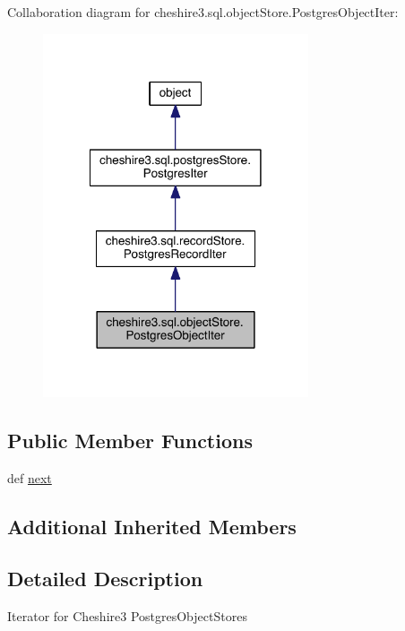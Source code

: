 Collaboration diagram for cheshire3.\-sql.\-object\-Store.\-Postgres\-Object\-Iter\-:
\nopagebreak
\begin{figure}[H]
\begin{center}
\leavevmode
\includegraphics[width=222pt]{classcheshire3_1_1sql_1_1object_store_1_1_postgres_object_iter__coll__graph}
\end{center}
\end{figure}
\subsection*{Public Member Functions}
\begin{DoxyCompactItemize}
\item 
def \hyperlink{classcheshire3_1_1sql_1_1object_store_1_1_postgres_object_iter_a9d0aad7f7a768a05ceea776857d479e0}{next}
\end{DoxyCompactItemize}
\subsection*{Additional Inherited Members}


\subsection{Detailed Description}
\begin{DoxyVerb}Iterator for Cheshire3 PostgresObjectStores\end{DoxyVerb}
 

